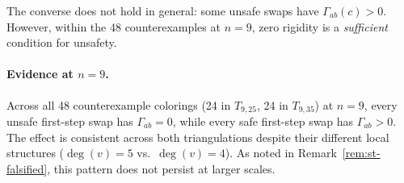 \begin{remark}\label{rem:converse}
The converse does not hold in general: some unsafe swaps have
$\Gamma_{ab}(c) > 0$. However, within the 48 counterexamples at $n = 9$,
zero rigidity is a \emph{sufficient} condition for unsafety.
\end{remark}

\paragraph{Evidence at $n = 9$.}
Across all 48 counterexample colorings (24 in $T_{9,25}$, 24 in
$T_{9,35}$) at $n = 9$, every unsafe first-step swap has
$\Gamma_{ab} = 0$, while every safe first-step swap has
$\Gamma_{ab} > 0$. The effect is consistent across both triangulations
despite their different local structures
($\deg(v) = 5$ vs.\ $\deg(v) = 4$). As noted in
Remark~\ref{rem:st-falsified}, this pattern does not persist at
larger scales.
